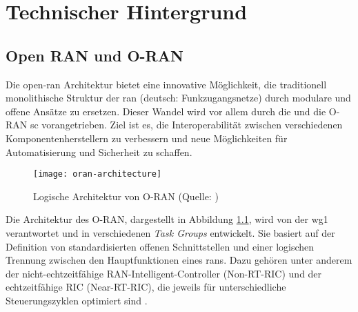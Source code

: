 \chapter{Technischer Hintergrund}
\label{chap:technischerHintergrund}

\section{Open RAN und O-RAN}
\label{sec:tech-openran}

Die \gls{open-ran} Architektur bietet eine innovative Möglichkeit, die traditionell monolithische Struktur der \gls{ran} (deutsch: Funkzugangsnetze) durch modulare und offene Ansätze zu ersetzen. Dieser Wandel wird vor allem durch die \orana und die O-RAN \gls{sc} vorangetrieben. Ziel ist es, die Interoperabilität zwischen verschiedenen Komponentenherstellern zu verbessern und neue Möglichkeiten für Automatisierung und Sicherheit zu schaffen.

\begin{figure}[H]
    \centering
    \texttt{[image: oran-architecture]}
    \caption{Logische Architektur von O-RAN (Quelle: \autocite{ORANAlliance})}
    \label{fig:oran-architecture}
\end{figure}

Die Architektur des O-RAN, dargestellt in Abbildung \ref{fig:oran-architecture}, wird von der \gls{wg1} verantwortet und in verschiedenen \textit{Task Groups} entwickelt. Sie basiert auf der Definition von standardisierten offenen Schnittstellen und einer logischen Trennung zwischen den Hauptfunktionen eines \glspl{ran}. Dazu gehören unter anderem der nicht-echtzeitfähige RAN-Intelligent-Controller (Non-RT-RIC) und der echtzeitfähige RIC (Near-RT-RIC), die jeweils für unterschiedliche Steuerungszyklen optimiert sind \autocite{o-ranworkgroup1usecasesandoverallarchitectureORANArchitectureDescription2024}. 

